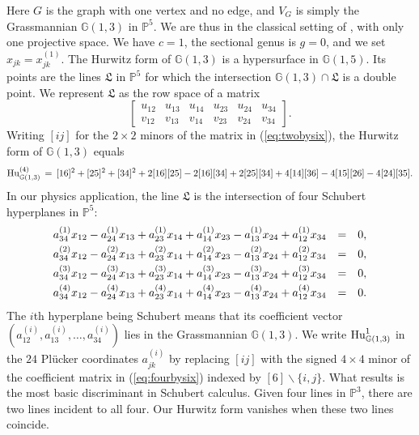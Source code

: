 \documentclass[12pt]{article}
\theoremstyle{definition}
\newenvironment{example}
{\pushQED{\qed}\renewcommand{\qedsymbol}{$\diamond$}\examplex}
{\popQED\endexamplex}
\newcommand{\bG}{\mathbb G}
\newcommand{\bP}{\mathbb P}
\begin{document}
\begin{example}[$\ell=1$] \label{ex:oldschubert}
Here $G$ is the graph with one vertex and no edge,
and $V_G$ is simply the Grassmannian $\bG(1,3)$ in $\bP^5$.
We are thus in the classical setting of \cite{hurwitz},
with only one projective space. We have $c=1$,
the sectional genus is $g=0$, and we set $x_{jk} = x^{(1)}_{jk}$.
The Hurwitz form of $\bG(1,3)$ is a hypersurface in $\bG(1,5)$.
Its points are the lines $\mathfrak{L}$ in $\bP^5$ for which the intersection  $\bG(1,3) \cap \mathfrak{L}$ is
a double point.  We represent $\mathfrak{L}$ as the row space of a matrix
\begin{equation}
\label{eq:twobysix}
\begin{bmatrix}
u_{12} & u_{13} & u_{14} & u_{23} & u_{24} & u_{34} \\
v_{12} & v_{13} & v_{14} & v_{23} & v_{24} & v_{34} 
\end{bmatrix}.
\end{equation}
Writing $[ij]$ for the $2 \times 2$ minors of the matrix in (\ref{eq:twobysix}), the Hurwitz form  of $\bG(1,3)$ equals
$$ {\rm Hu}_{\bG(1,3)}^{(4)} \,=\,
 [16]^2 + [25]^2 + [34]^2 +2 [16] [25]-2 [16] [34]
+2 [25] [34]+4 [14] [36]-4 [15] [26]-4 [24] [35]. $$
In our physics application, the line $\mathfrak{L}$ is the intersection of four Schubert hyperplanes in $\bP^5$:
\begin{equation}
\label{eq:fourbysix}
\begin{matrix} 
a^{(1)}_{34} x_{12} -  a^{(1)}_{24} x_{13} + a^{(1)}_{23} x_{14} + a^{(1)}_{14} x_{23} - a^{(1)}_{13} x_{24} + a^{(1)}_{12} x_{34} & = & 0,
\smallskip \\
a^{(2)}_{34} x_{12} -  a^{(2)}_{24} x_{13} + a^{(2)}_{23} x_{14} + a^{(2)}_{14} x_{23} - a^{(2)}_{13} x_{24} + a^{(2)}_{12} x_{34} & = & 0,
\smallskip \\
a^{(3)}_{34} x_{12} -  a^{(3)}_{24} x_{13} + a^{(3)}_{23} x_{14} + a^{(3)}_{14} x_{23} - a^{(3)}_{13} x_{24} + a^{(3)}_{12} x_{34} & = & 0,
\smallskip \\
a^{(4)}_{34} x_{12} -  a^{(4)}_{24} x_{13} + a^{(4)}_{23} x_{14} + a^{(4)}_{14} x_{23} - a^{(4)}_{13} x_{24} + a^{(4)}_{12} x_{34} & = & 0.
\end{matrix}
\end{equation}
The $i$th hyperplane being Schubert means that its coefficient vector
$( a^{(i)}_{12},  a^{(i)}_{13}, \ldots, a^{(i)}_{34})$ lies in the Grassmannian $\bG(1,3)$.
We write $ {\rm Hu}_{\bG(1,3)}^{1} $ in the
$24$ Pl\"ucker coordinates $a^{(i)}_{jk}$ by replacing
$[ij]$ with the signed $4 \times 4$ minor of the coefficient matrix in (\ref{eq:fourbysix}) indexed by $[6] \backslash \{i,j\}$.
What results is the most basic discriminant in Schubert calculus.
Given four lines in $\bP^3$, there are two lines incident to all four.
Our Hurwitz form vanishes when these two lines coincide.
\end{example}
\end{document}
